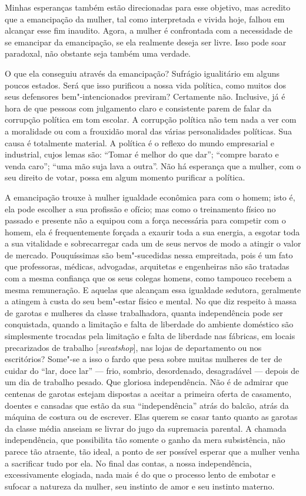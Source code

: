 Minhas esperanças também estão direcionadas para esse objetivo, mas
acredito que a emancipação da mulher, tal como interpretada e vivida
hoje, falhou em alcançar esse fim inaudito. Agora, a mulher é
confrontada com a necessidade de se emancipar da emancipação, se ela
realmente deseja ser livre. Isso pode soar paradoxal, não obstante seja
também uma verdade.

O que ela conseguiu através da emancipação? Sufrágio igualitário em
alguns poucos estados. Será que isso purificou a nossa vida política,
como muitos dos seus defensores bem"-intencionados previram? Certamente
não. Inclusive, já é hora de que pessoas com julgamento claro e
consistente parem de falar da corrupção política em tom escolar.
A corrupção política não tem nada a ver com a
moralidade ou com a frouxidão moral das várias personalidades
políticas. Sua causa é totalmente material. A política é o reflexo do
mundo empresarial e industrial, cujos lemas são: ``Tomar é melhor do que
dar''; ``compre barato e venda caro''; ``uma mão suja lava a outra''.
Não há esperança que a mulher, com o seu direito de votar, possa em
algum momento purificar a política.

A emancipação trouxe à mulher igualdade econômica para com o homem; isto
é, ela pode escolher a sua profissão e ofício; mas como o treinamento
físico no passado e presente não a equipou com a força necessária para
competir com o homem, ela é frequentemente forçada a exaurir toda a sua
energia, a esgotar toda a sua vitalidade e sobrecarregar cada um de seus
nervos de modo a atingir o valor de mercado. Pouquíssimas são
bem"-sucedidas nessa empreitada, pois é um fato que professoras, médicas,
advogadas, arquitetas e engenheiras não são tratadas com a mesma
confiança que os seus colegas homens, como tampouco recebem a mesma
remuneração. E aquelas que alcançam essa igualdade sedutora, geralmente
a atingem à custa do seu bem"-estar físico e mental. No que diz respeito
à massa de garotas e mulheres da classe trabalhadora, quanta
independência pode ser conquistada, quando a limitação e falta de
liberdade do ambiente doméstico são simplesmente trocadas pela limitação e falta de
liberdade nas fábricas, em locais precarizados de trabalho
{[}\emph{sweatshop}{]}, nas lojas de departamento ou nos escritórios?
Some"-se a isso o fardo que pesa sobre muitas mulheres de ter de cuidar
do ``lar, doce lar'' --- frio, sombrio, desordenado, desagradável --- depois de um dia de trabalho pesado. Que gloriosa independência. Não é
de admirar que centenas de garotas estejam dispostas a aceitar a
primeira oferta de casamento, doentes e cansadas que estão da sua
``independência'' atrás do balcão, atrás da máquina de costura ou de
escrever. Elas querem se casar tanto quanto as garotas da classe média
anseiam se livrar do jugo da supremacia parental. A chamada
independência, que possibilita tão somente o ganho da mera subsistência,
não parece tão atraente, tão ideal, a ponto de ser possível esperar que
a mulher venha a sacrificar tudo por ela. No final das contas, a nossa
independência, excessivamente elogiada, nada mais é do que o processo
lento de embotar e sufocar a natureza da mulher, seu instinto de amor e
seu instinto materno.

